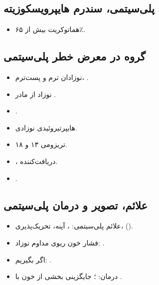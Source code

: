 \documentclass[12pt,a4paper]{article}
\begin{document}
\subsection*{پلی‌سیتمی، سندرم هایپرویسکوزیته}
\begin{itemize}
\item هماتوکریت بیش از ۶۵٪.
\end{itemize}

\subsection*{گروه در معرض خطر پلی‌سیتمی}
\begin{itemize}
\item نوزادان ترم و پست‌ترم، .
\item نوزاد از مادر .
\item {}.
\item هایپرتیروئیدی نوزادی.
\item تریزومی ۱۳ و ۱۸.
\item {}، دریافت‌کننده.
\item {}.
\end{itemize}
\subsection*{علائم، تصویر و درمان پلی‌سیتمی}
\begin{itemize}
\item علائم پلی‌سیتمی: ، آپنه، تحریک‌پذیری،
 ().
\item فشار خون ریوی مداوم نوزاد: .
\item اگر  بگیریم: .
\item درمان: ؛ جایگزینی بخشی از خون با .
\end{itemize}
\end{document}
